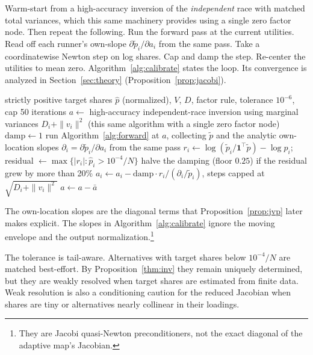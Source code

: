 \documentclass[12pt]{article}
\theoremstyle{remark}
\begin{document}
Warm-start from a high-accuracy inversion of
the \emph{independent} race with matched total variances, which this
same machinery provides using a single zero factor node. Then repeat the following. Run
the forward pass at the current utilities. Read off each runner's
own-slope $\partial \tilde p_i / \partial a_i$ from the same pass. Take a coordinatewise Newton step on log
shares. Cap and damp the step. Re-center the utilities to mean zero.
Algorithm~\ref{alg:calibrate} states the loop. Its convergence is
analyzed in Section~\ref{sec:theory} (Proposition~\ref{prop:jacobi}).

\begin{algorithm}[H]
\caption{Calibration (damped Jacobi quasi-Newton)}
\label{alg:calibrate}
\begin{algorithmic}[1]
\Require strictly positive target shares $\hat p$ (normalized), $V$, $D$,
factor rule, tolerance $10^{-6}$, cap 50 iterations
\State $a \gets$ high-accuracy independent-race inversion using
marginal variances $D_i + \|v_i\|^2$ (this same algorithm with a
single zero factor node) 
\State $\mathrm{damp} \gets 1$
\Repeat
  \State run Algorithm~\ref{alg:forward} at $a$, collecting $\tilde p$
  and the analytic own-location slopes $\partial_i = \partial \tilde
  p_i / \partial a_i$ from the same pass
  \State $r_i \gets \log(\tilde p_i / \mathbf{1}^\top \tilde p) -
  \log \hat p_i$; residual $\gets \max\{|r_i| : \hat p_i >
  10^{-4}/N\}$
  \State halve the damping (floor $0.25$) if the residual grew by more
  than 20\%
  \State $a_i \gets a_i - \mathrm{damp} \cdot r_i / (\partial_i /
  \tilde p_i)$, steps capped at $\sqrt{D_i + \|v_i\|^2}$
  \State $a \gets a - \bar a$ 
\end{algorithmic}
\end{algorithm}

The own-location slopes are the diagonal terms that
Proposition~\ref{prop:jvp} later makes explicit. The slopes in
Algorithm~\ref{alg:calibrate} ignore the moving envelope and the output
normalization.\footnote{They are Jacobi quasi-Newton preconditioners,
not the exact diagonal of the adaptive map's Jacobian.}

The tolerance is tail-aware. Alternatives with target shares below
$10^{-4}/N$ are matched best-effort. By Proposition~\ref{thm:inv} they
remain uniquely determined, but they are weakly resolved when target
shares are estimated from finite data.
Weak resolution is also a conditioning caution for the reduced
Jacobian when shares are tiny or alternatives nearly collinear in their
loadings.
\end{document}
